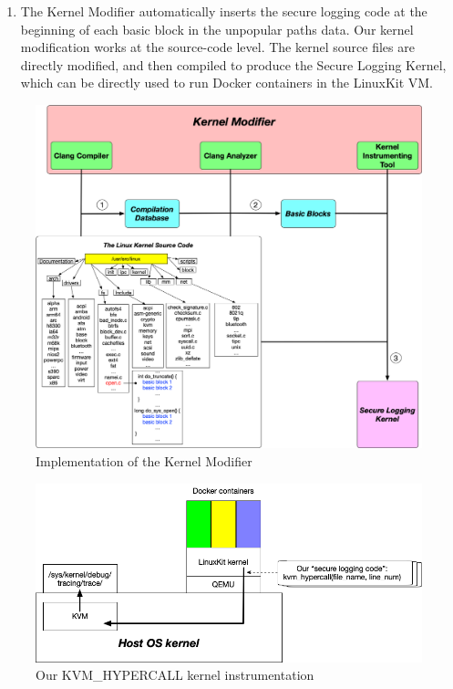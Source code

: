 \begin{enumerate}
	and our instrumenting tool will add the security logging code at the beginning of this block. If we discover that an entire function has no  lines in the popular paths data, we consider this an unpopular function, 
	and just add our security logging code once where it starts . This allows us to avoid adding redundant and unnecessary code. 
	The secure logging code we inserted in front of the unpopular paths was a kvm hypercall from the LinuxKit kernel into the host Linux kernel (Shown in Figure \ref{fig:kvm_hypercall}). 
	In this way, we can guarantee minimal affect on the LinuxKit kernel functionality, while still being able to generate security logging whenever unpopular paths were reached.
	\item The Kernel Modifier automatically inserts the secure logging code at the beginning of each basic block in the unpopular paths data. 
	Our kernel modification works at the source-code level. 
	The kernel source files are directly modified, and then compiled to produce the Secure Logging Kernel, which can be directly used to run Docker containers in the LinuxKit VM. 
\end{enumerate}

\begin{figure}
\centering
\includegraphics[width=1.5\columnwidth]{diagram/linuxkit-kernel-modifier.png}
\caption{\small Implementation of the Kernel Modifier}
\label{fig:linuxkit-kernel-modifier}
\end{figure}

\begin{figure}
\centering
\includegraphics[width=1.5\columnwidth]{diagram/kvm_hypercall.png}
\caption{\small Our KVM\_HYPERCALL kernel instrumentation}
\label{fig:kvm_hypercall}
\end{figure}
